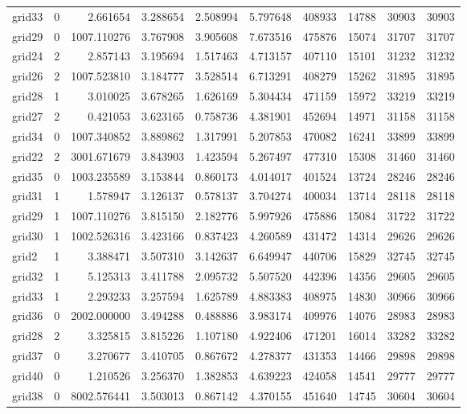 \begin{longtable}{|l|r|r|r|r|r|r|r|r|r|}
grid33 & 0 & 2.661654 & 3.288654 & 2.508994 & 5.797648 & 408933 & 14788 & 30903 & 30903 \\
grid29 & 0 & 1007.110276 & 3.767908 & 3.905608 & 7.673516 & 475876 & 15074 & 31707 & 31707 \\
grid24 & 2 & 2.857143 & 3.195694 & 1.517463 & 4.713157 & 407110 & 15101 & 31232 & 31232 \\
grid26 & 2 & 1007.523810 & 3.184777 & 3.528514 & 6.713291 & 408279 & 15262 & 31895 & 31895 \\
grid28 & 1 & 3.010025 & 3.678265 & 1.626169 & 5.304434 & 471159 & 15972 & 33219 & 33219 \\
grid27 & 2 & 0.421053 & 3.623165 & 0.758736 & 4.381901 & 452694 & 14971 & 31158 & 31158 \\
grid34 & 0 & 1007.340852 & 3.889862 & 1.317991 & 5.207853 & 470082 & 16241 & 33899 & 33899 \\
grid22 & 2 & 3001.671679 & 3.843903 & 1.423594 & 5.267497 & 477310 & 15308 & 31460 & 31460 \\
grid35 & 0 & 1003.235589 & 3.153844 & 0.860173 & 4.014017 & 401524 & 13724 & 28246 & 28246 \\
grid31 & 1 & 1.578947 & 3.126137 & 0.578137 & 3.704274 & 400034 & 13714 & 28118 & 28118 \\
grid29 & 1 & 1007.110276 & 3.815150 & 2.182776 & 5.997926 & 475886 & 15084 & 31722 & 31722 \\
grid30 & 1 & 1002.526316 & 3.423166 & 0.837423 & 4.260589 & 431472 & 14314 & 29626 & 29626 \\
grid2 & 1 & 3.388471 & 3.507310 & 3.142637 & 6.649947 & 440706 & 15829 & 32745 & 32745 \\
grid32 & 1 & 5.125313 & 3.411788 & 2.095732 & 5.507520 & 442396 & 14356 & 29605 & 29605 \\
grid33 & 1 & 2.293233 & 3.257594 & 1.625789 & 4.883383 & 408975 & 14830 & 30966 & 30966 \\
grid36 & 0 & 2002.000000 & 3.494288 & 0.488886 & 3.983174 & 409976 & 14076 & 28983 & 28983 \\
grid28 & 2 & 3.325815 & 3.815226 & 1.107180 & 4.922406 & 471201 & 16014 & 33282 & 33282 \\
grid37 & 0 & 3.270677 & 3.410705 & 0.867672 & 4.278377 & 431353 & 14466 & 29898 & 29898 \\
grid40 & 0 & 1.210526 & 3.256370 & 1.382853 & 4.639223 & 424058 & 14541 & 29777 & 29777 \\
grid38 & 0 & 8002.576441 & 3.503013 & 0.867142 & 4.370155 & 451640 & 14745 & 30604 & 30604 \\

\end{longtable}
